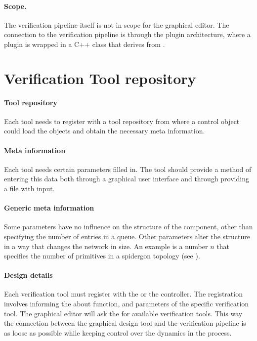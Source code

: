 \paragraph{Scope.} The verification pipeline itself is
not in scope for the graphical editor. The connection to the verification 
pipeline is through the plugin architecture, where a plugin is wrapped 
in a C++ class that derives from .


\section{Verification Tool repository}

\paragraph{Tool repository} Each tool needs to register with a 
tool repository from where a control object could load the 
objects and obtain the necessary meta information. 

\paragraph{Meta information} Each tool needs certain parameters 
filled in. The tool should provide a method of entering this data 
both through a graphical user interface and through providing a 
file with input.

\paragraph{Generic meta information} Some parameters have no influence
on the structure of the component, other than specifying the number
of entries in a queue. Other parameters alter the structure in a way
that changes the network in size. An example is a number $n$ that
specifies the number of primitives in a spidergon topology (see \cite{}).

\paragraph{Design details} Each verification tool must register 
with the  or the controller. The registration 
involves informing the  about function, and parameters 
of the specific verification tool. The graphical editor will ask the 
 for available verification tools. This way the connection
between the graphical design tool and the verification pipeline
is as loose as possible while keeping control over the dynamics
in the process.



